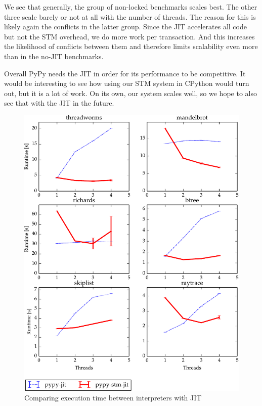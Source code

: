 \documentclass{sigplanconf}
\begin{document}
We see that generally, the group of non-locked benchmarks scales
best. The other three scale barely or not at all with the number of
threads. The reason for this is likely again the conflicts in the
latter group. Since the JIT accelerates all code but not the STM
overhead, we do more work per transaction. And this increases the
likelihood of conflicts between them and therefore limits scalability
even more than in the no-JIT benchmarks.

Overall PyPy needs the JIT in order for its performance to be
competitive. It would be interesting to see how using our STM system
in CPython would turn out, but it is a lot of work. On its own, our
system scales well, so we hope to also see that with the JIT in the
future.


\begin{figure}[h]
  \centering
  \includegraphics[width=1\columnwidth]{plots/performance.pdf}
  \caption{Comparing execution time between interpreters with JIT\label{fig:performance-jit}}
\end{figure}
\end{document}
